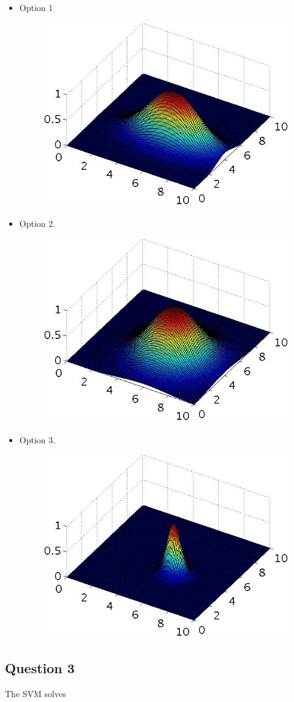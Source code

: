 \documentclass[11pt]{article} %
\begin{document}
\begin{itemize}
	\item Option 1\begin{figure}[h!]
		\centering
		\includegraphics[width=0.5\linewidth]{images/SVM3}
	\end{figure}
	
	\item Option 2.
	\begin{figure}[h!]
		\centering
		\includegraphics[width=0.5\linewidth]{images/SVM4}
	\end{figure}
	
	\item Option 3.
	
	\begin{figure}[h!]
		\centering
		\includegraphics[width=0.5\linewidth]{images/SVM5}
	\end{figure}
\end{itemize}


\subsection*{Question 3}
The SVM solves
\end{document}
